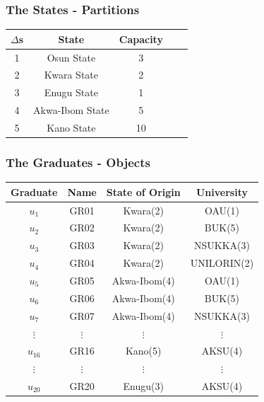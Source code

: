 \documentclass[10pt]{beamer}
\begin{document}
			\begin{frame}
				\frametitle{The States - Partitions}
				\begin{center}
					\begin{tabular}{|c|c|c|c|c|}
						\hline
						\textbf{$\Delta$s} & \textbf{State} & \textbf{Capacity} \\
						\hline
						1 & Osun State & 3\\
						\hline
						2 & Kwara State & 2\\
						\hline
						3 & Enugu State & 1\\
						\hline
						4 & Akwa-Ibom State & 5\\
						\hline
						5 & Kano State & 10\\
						\hline
					\end{tabular}		
				\end{center}
			\end{frame}
			\begin{frame}
				\frametitle{The Graduates - Objects}				
				\begin{center}
					\begin{tabular}{|c|c|c|c|}
						\hline
						\textbf{Graduate} & \textbf{Name} & \textbf{State of Origin} & \textbf{University}\\
						\hline
						$u_{1}$ & GR01 & Kwara(2) & OAU(1)\\
						\hline
						$u_{2}$ & GR02 & Kwara(2) & BUK(5)\\
						\hline
						$u_{3}$ & GR03 & Kwara(2) & NSUKKA(3)\\
						\hline
						$u_{4}$ & GR04 & Kwara(2) & UNILORIN(2)\\
						\hline
						$u_{5}$ & GR05 & Akwa-Ibom(4) & OAU(1)\\
						\hline
						$u_{6}$ & GR06 & Akwa-Ibom(4) & BUK(5)\\
						\hline
						$u_{7}$ & GR07 & Akwa-Ibom(4) & NSUKKA(3)\\
						\hline
						$\vdots $ & $\vdots $ & $\vdots $ & $\vdots $ \\
						\hline
						$u_{16}$ & GR16 & Kano(5) & AKSU(4)\\
						\hline
						$\vdots $ & $\vdots $ & $\vdots $ & $\vdots $ \\
						\hline
						$u_{20}$ & GR20 & Enugu(3) & AKSU(4)\\
						\hline
					\end{tabular}		
				\end{center}
			\end{frame}
\end{document}
